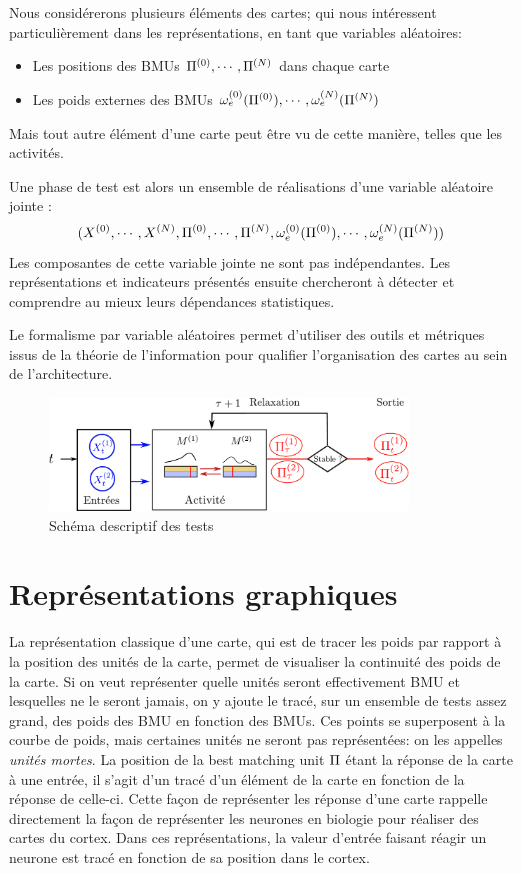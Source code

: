 Nous considérerons plusieurs éléments des cartes; qui nous intéressent particulièrement dans les représentations, en tant que variables aléatoires: 
\begin{itemize}
\item Les positions des BMUs $\Pi^{({0})}, \cdots, \Pi^{({N})}$ dans chaque carte
\item Les poids externes des BMUs $\omega_e^{({0})}(\Pi^{({0})}), \cdots, \omega_e^{({N})}(\Pi^{({N})})$
\end{itemize}
Mais tout autre élément d'une carte peut être vu de cette manière, telles que les activités.


Une phase de test est alors un ensemble de réalisations d'une variable aléatoire jointe : 
$$(X^{({0})}, \cdots, X^{({N})}, \Pi^{({0})}, \cdots, \Pi^{({N})}, \omega_e^{({0})}(\Pi^{({0})}), \cdots, \omega_e^{({N})}(\Pi^{({N})}))$$
Les composantes de cette variable jointe ne sont pas indépendantes. Les représentations et indicateurs présentés ensuite chercheront à détecter et comprendre au mieux leurs dépendances statistiques.

Le formalisme par variable aléatoires permet d'utiliser des outils et métriques issus de la théorie de l'information pour qualifier l'organisation des cartes au sein de l'architecture.

\begin{figure}
\centering
\includegraphics[width=0.85\textwidth]{tests_2maps.pdf}
\caption{Schéma descriptif des tests}
\label{fig:flowchart}
\end{figure}


\section{Représentations graphiques}

La représentation classique d'une carte, qui est de tracer les poids par rapport à la position des unités de la carte, permet de visualiser la continuité des poids de la carte. 
Si on veut représenter quelle unités seront effectivement BMU et lesquelles ne le seront jamais, on y ajoute le tracé, sur un ensemble de tests assez grand, des poids des BMU en fonction des BMUs. Ces points se superposent à la courbe de poids, mais certaines unités ne seront pas représentées: on les appelles \emph{unités mortes}. La position de la best matching unit $\Pi$ étant la réponse de la carte à une entrée, il s'agit d'un tracé d'un élément de la carte en fonction de la réponse de celle-ci. 
Cette façon de représenter les réponse d'une carte rappelle directement la façon de représenter les neurones en biologie pour réaliser des cartes du cortex. Dans ces représentations, la valeur d'entrée faisant réagir un neurone est tracé en fonction de sa position dans le cortex.

